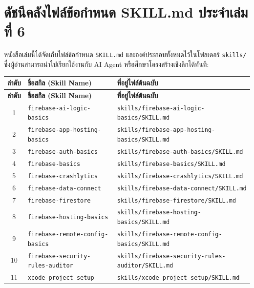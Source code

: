\section{ดัชนีคลังไฟล์ข้อกำหนด SKILL.md ประจำเล่มที่ 6}

หนังสือเล่มนี้ได้จัดเก็บไฟล์ข้อกำหนด \texttt{SKILL.md} และองค์ประกอบทั้งหมดไว้ในโฟลเดอร์ \texttt{skills/} ซึ่งผู้อ่านสามารถนำไปเรียกใช้งานกับ AI Agent หรือศึกษาโครงสร้างเชิงลึกได้ทันที:

\small
\begin{longtable}{|c|p{}|p{}|}
\hline
\textbf{ลำดับ} & \textbf{ชื่อสกิล (Skill Name)} & \textbf{ที่อยู่ไฟล์ต้นฉบับ} \\ \hline
\endfirsthead
\hline
\textbf{ลำดับ} & \textbf{ชื่อสกิล (Skill Name)} & \textbf{ที่อยู่ไฟล์ต้นฉบับ} \\ \hline
\endhead
1 & \texttt{firebase-ai-logic-basics} & \texttt{skills/firebase-ai-logic-basics/SKILL.md} \\ \hline
2 & \texttt{firebase-app-hosting-basics} & \texttt{skills/firebase-app-hosting-basics/SKILL.md} \\ \hline
3 & \texttt{firebase-auth-basics} & \texttt{skills/firebase-auth-basics/SKILL.md} \\ \hline
4 & \texttt{firebase-basics} & \texttt{skills/firebase-basics/SKILL.md} \\ \hline
5 & \texttt{firebase-crashlytics} & \texttt{skills/firebase-crashlytics/SKILL.md} \\ \hline
6 & \texttt{firebase-data-connect} & \texttt{skills/firebase-data-connect/SKILL.md} \\ \hline
7 & \texttt{firebase-firestore} & \texttt{skills/firebase-firestore/SKILL.md} \\ \hline
8 & \texttt{firebase-hosting-basics} & \texttt{skills/firebase-hosting-basics/SKILL.md} \\ \hline
9 & \texttt{firebase-remote-config-basics} & \texttt{skills/firebase-remote-config-basics/SKILL.md} \\ \hline
10 & \texttt{firebase-security-rules-auditor} & \texttt{skills/firebase-security-rules-auditor/SKILL.md} \\ \hline
11 & \texttt{xcode-project-setup} & \texttt{skills/xcode-project-setup/SKILL.md} \\ \hline
\end{longtable}
\normalsize
